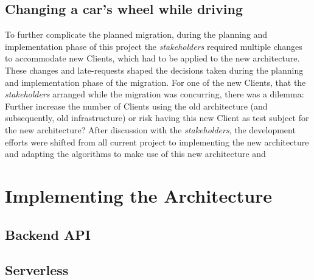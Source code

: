 \subsection{Changing a car's wheel while driving}\label{methodology:s:changing-a-cars-wheel-while-driving}
To further complicate the planned migration, during the planning and implementation phase of this project the \textit{stakeholders} required multiple changes to accommodate new Clients, which had to be applied to the new architecture. These changes and late-requests shaped the decisions taken during the planning and implementation phase of the migration. For one of the new Clients, that the \textit{stakeholders} arranged while the migration was concurring, there was a dilemma: Further increase the number of Clients using the old architecture (and subsequently, old infrastructure) or risk having this new Client as test subject for the new architecture? After discussion with the \textit{stakeholders}, the development efforts were shifted from all current project to implementing the new architecture and adapting the algorithms to make use of this new architecture and 



\section{Implementing the Architecture}\label{methodology:s:implementing-the-architecture}
\subsection{Backend API}\label{methodology:ss:backendapi}
\subsection{Serverless}\label{methodology:ss:serverless}






